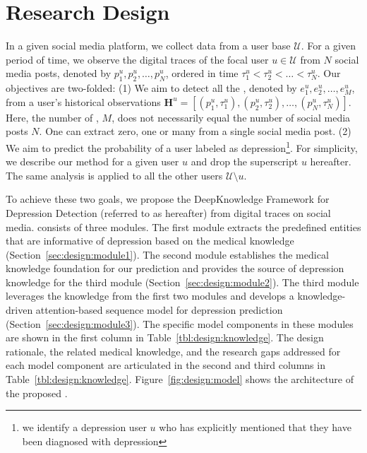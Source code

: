 \section{Research Design}\label{sec:design}

In a given social media platform, we collect data from a user base $\mathcal{U}$. For a given period of time, we observe the digital traces of the focal user $u\in \mathcal{U}$ from $N$ social media posts, denoted by $p_1^u, p_2^u, \ldots, p_N^u$, ordered in time $\tau_1^u < \tau_2^u < \ldots < \tau_N^u$. Our objectives are two-folded: (1) We aim to detect all the \entity, denoted by $e_1^u, e_2^u, \ldots, e_M^u$, from a user's historical observations $\boldsymbol{H}^u = \left[\left(p_1^u, \tau_1^u\right), \left(p_2^u, \tau_2^u\right), \ldots, \left(p_N^u, \tau_N^u\right)\right]$. Here, the number of \entity, $M$, does not necessarily equal the number of social media posts $N$. One can extract zero, one or many \entity from a single social media post. (2) We aim to predict the probability of a user labeled as depression\footnote{we identify a depression user $u$ who has explicitly mentioned that they have been diagnosed with depression}. For simplicity, we describe our method for a given user $u$ and drop the superscript $u$ hereafter. The same analysis is applied to all the other users $\mathcal{U} \setminus u$. 

To achieve these two goals, we propose the DeepKnowledge Framework for Depression Detection (referred to as \model hereafter) from digital traces on social media. \model consists of three modules. 
The first module extracts the predefined entities that are informative of depression based on the medical knowledge (Section~\ref{sec:design:module1}). The second module establishes the medical knowledge foundation for our prediction and provides the source of depression knowledge for the third module (Section~\ref{sec:design:module2}). The third module leverages the knowledge from the first two modules and develops a knowledge-driven attention-based sequence model for depression prediction (Section~\ref{sec:design:module3}). 
The specific model components in these modules are shown in the first column in Table~\ref{tbl:design:knowledge}. The design rationale, the related medical knowledge, and the research gaps addressed for each model component are articulated in the second and third columns in Table~\ref{tbl:design:knowledge}. Figure~\ref{fig:design:model} shows the architecture of the proposed \model. 

